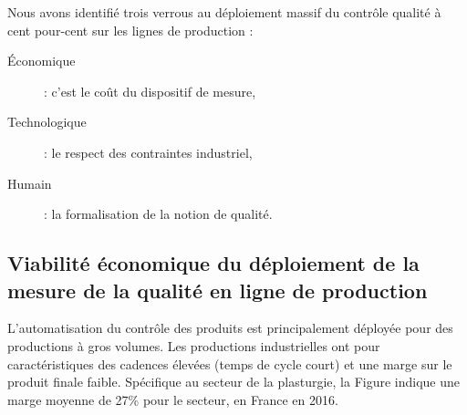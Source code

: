 Nous avons identifié trois verrous au déploiement massif du contrôle qualité à cent pour-cent sur les lignes de production :
\begin{description}
	\item[Économique] : c’est le coût du dispositif de mesure,
	\item[Technologique] : le respect des contraintes industriel,
	\item[Humain] : la formalisation de la notion de qualité.
\end{description}

\subsection{Viabilité économique du déploiement de la mesure de la qualité en ligne de production}

L'automatisation du contrôle des produits est principalement déployée pour des productions à gros volumes.
Les productions industrielles ont pour caractéristiques des cadences élevées (temps de cycle court) et une marge sur le produit finale faible.
Spécifique au secteur de la plasturgie, la Figure \cite{directiongeneraledesentreprises_chiffres_2019} indique une marge moyenne de 27\% pour le secteur, en France en 2016.

